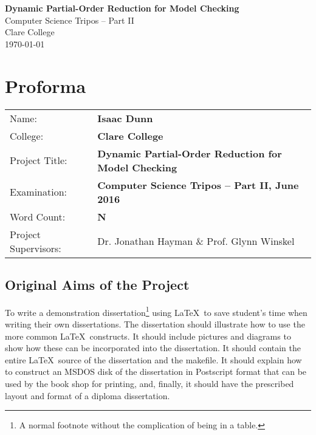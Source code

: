 \documentclass[12pt,a4paper,twoside,openright]{report}
\begin{document}





\pagestyle{empty}


\vspace*{60mm}
\begin{center}
\Huge
\textbf{Dynamic Partial-Order Reduction for Model Checking} \\[5mm]
Computer Science Tripos -- Part II \\[5mm]
Clare College \\[5mm]
\today  %
\end{center}


\pagestyle{plain}

\chapter*{Proforma}

{\large
\begin{tabular}{ll}
Name:               & \bf Isaac Dunn                            			 \\
College:            & \bf Clare College                    				     \\
Project Title:      & \bf Dynamic Partial-Order Reduction for Model Checking \\
Examination:        & \bf Computer Science Tripos -- Part II, June 2016      \\
Word Count:         & \bf N    \\
Project Supervisors:& Dr. Jonathan Hayman \& Prof. Glynn Winskel             \\ 
\end{tabular}
}


\section*{Original Aims of the Project}

To write a demonstration dissertation\footnote{A normal footnote without the
complication of being in a table.} using \LaTeX\ to save
student's time when writing their own dissertations. The dissertation
should illustrate how to use the more common \LaTeX\ constructs. It
should include pictures and diagrams to show how these can be
incorporated into the dissertation.  It should contain the entire
\LaTeX\ source of the dissertation and the makefile.  It should
explain how to construct an MSDOS disk of the dissertation in
Postscript format that can be used by the book shop for printing, and,
finally, it should have the prescribed layout and format of a diploma
dissertation.
\end{document}
